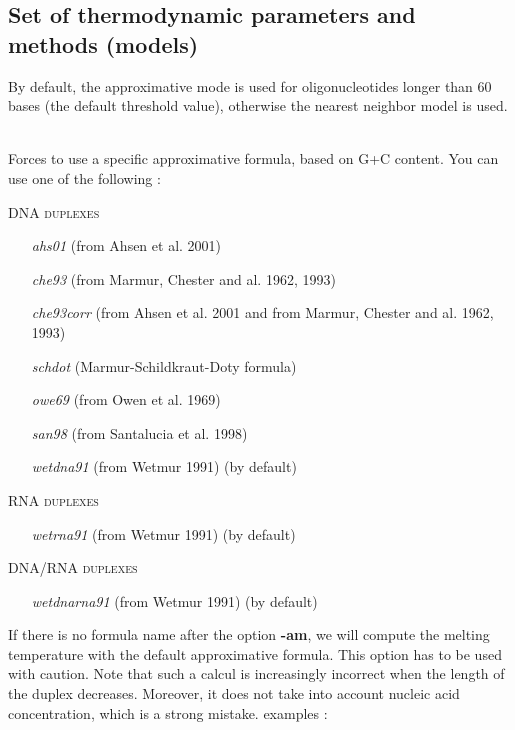 \documentclass{article}
\begin{document}
\subsection{Set of thermodynamic parameters and methods (models)}
\begin{description}

By default, the approximative mode is used for oligonucleotides longer than 60 bases (the default threshold value), otherwise the nearest 
neighbor model is used. 

\item [\textbf{-am} \textit{method\_name}]\mbox{}\\ 
  Forces to use a specific approximative formula, based on G+C content. You can use one of the following :
  
  \textsc{DNA duplexes}
    \begin{itemize}
    \item [\textit{ahs01}] (from Ahsen et al. 2001)
    \item [\textit{che93}] (from Marmur, Chester and al. 1962, 1993)
    \item [\textit{che93corr}] (from Ahsen et al. 2001 and from Marmur, Chester and al. 1962, 1993)
    \item [\textit{schdot}] (Marmur-Schildkraut-Doty formula)
    \item [\textit{owe69}] (from Owen et al. 1969)
    \item [\textit{san98}] (from Santalucia et al. 1998)
    \item [\textit{wetdna91}] (from Wetmur 1991)  (by default)
    \end{itemize}
  \textsc{RNA duplexes}
    \begin{itemize}
    \item [\textit{wetrna91}] (from Wetmur 1991)  (by default)
    \end{itemize}
  \textsc{DNA/RNA duplexes}
    \begin{itemize}
    \item [\textit{wetdnarna91}] (from Wetmur 1991)  (by default)
    \end{itemize}
  If there is no formula name after the option \textbf{-am}, we will compute the melting temperature with the default approximative formula.
  This option has to be used with caution. Note that such a calcul is increasingly incorrect when the length of  the duplex 
  decreases. Moreover, it does not take into account nucleic acid concentration, which is a strong mistake.
  examples :
  

\end{description}
\end{document}
